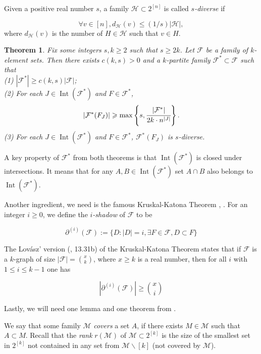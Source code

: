 \documentclass[12pt,a4paper]{article}
\newtheorem{Theorem}{Theorem}
\begin{document}
Given a positive real number $s$, a family $\mathcal{H} \subset 2^{[n]}$ is called \textit{$s$-diverse} if

$$
\forall v \in [n], d_{\mathcal{H}}(v) \leqslant (1 / s)|\mathcal{H}|,
$$
where $d_{\mathcal{H}}(v)$ is the number of $H \in \mathcal{H}$ such that $v \in H$. 

\begin{Theorem}\label{thm8}
Fix some integers $s,k \geqslant 2$ such that $s \geqslant 2k$. Let $\mathcal{F}$ be a family of $k$-element sets. Then there exists $c(k, s)>0$ and a $k$-partite family $\mathcal{F}^* \subset \mathcal{F}$ such that\\
(1) $\left|\mathcal{F}^*\right| \geqslant c(k, s)|\mathcal{F}|$;\\
(2) For each $J \in \operatorname{Int}(\mathcal{F}^*)$ and $F \in \mathcal{F}^*$, $$|\mathcal{F}^*(F_J)| \geqslant \max\left\{s, \cfrac{|\mathcal{F}^*|}{2k \cdot n^{|J|}}\right\}.$$ 
(3) For each $J \in \operatorname{Int}(\mathcal{F}^*)$ and $F \in \mathcal{F}^*$, $\mathcal{F}^*(F_J)$ is $s$-diverse.
\end{Theorem}

A key property of $\mathcal{F}^*$ from both theorems is that $\operatorname{Int}(\mathcal{F}^*)$ is closed under intersections. It means that for any $A,B \in \operatorname{Int}(\mathcal{F}^*)$ set $A \cap B$ also belongs to $\operatorname{Int}(\mathcal{F}^*)$. 

Another ingredient, we need is the famous Kruskal-Katona Theorem \cite{Kru}, \cite{Kat2}. For an integer $i \geqslant 0$, we define the \textit{$i$-shadow} of $\mathcal{F}$ to be

$$
\partial^{(i)}(\mathcal{F}):=\{D:|D|=i, \exists F \in \mathcal{F}, D \subset F\}
$$

The Lovász' version (\cite{Lov}, 13.31b) of the Kruskal-Katona Theorem states that if $\mathcal{F}$ is a $k$-graph of size $|\mathcal{F}|=\binom{x}{k}$, where $x \geqslant k$ is a real number, then for all $i$ with $1 \leqslant i \leqslant k-1$ one has

$$
\left|\partial^{(i)}(\mathcal{F})\right| \geqslant \binom{ x}{i}
$$

Lastly, we will need one lemma and one theorem from \cite{FF}.

We say that some family $\mathcal{M}$ \textit{covers} a set $A$, if there exists $M \in \mathcal{M}$ such that $A \subset M$.
Recall that the \textit{rank}  $r(\mathcal{M})$ of $\mathcal{M} \subset 2^{[k]}$ is the size of the smallest set in $2^{[k]}$ not contained in any set from $\mathcal{M} \backslash[k]$ (not covered by $\mathcal{M}$).
\end{document}
